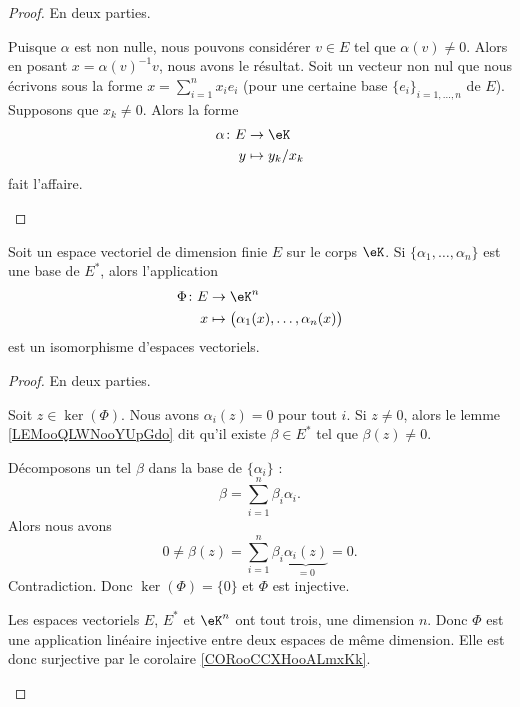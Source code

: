 \begin{proof}
	En deux parties.
	\begin{subproof}
		Puisque \( \alpha\) est non nulle, nous pouvons considérer \( v\in E\) tel que \( \alpha(v)\neq 0\). Alors en posant \( x=\alpha(v)^{-1}  v\), nous avons le résultat.
		Soit un vecteur non nul que nous écrivons sous la forme \( x=\sum_{i=1}^nx_ie_i\) (pour une certaine base \( \{ e_i \}_{i=1,\ldots, n}\) de \( E\)). Supposons que \( x_k\neq 0\). Alors la forme
		\begin{equation}
			\begin{aligned}
				\alpha\colon  E & \to \eK         \\
				y               & \mapsto y_k/x_k
			\end{aligned}
		\end{equation}
		fait l'affaire.
	\end{subproof}
\end{proof}

\begin{lemma}       \label{LEMooKTREooBrnWVz}
	Soit un espace vectoriel de dimension finie \( E\) sur le corps \( \eK\). Si \( \{ \alpha_1,\ldots,\alpha_n \}\) est une base de \( E^*\), alors l'application
	\begin{equation}
		\begin{aligned}
			\Phi\colon E & \to \eK^n                                           \\
			x            & \mapsto \big( \alpha_1(x),\ldots, \alpha_n(x) \big)
		\end{aligned}
	\end{equation}
	est un isomorphisme d'espaces vectoriels.
\end{lemma}

\begin{proof}
	En deux parties.
	\begin{subproof}
		Soit \( z\in \ker(\Phi)\). Nous avons \( \alpha_i(z)=0\) pour tout \( i\). Si \( z\neq 0\), alors le lemme \ref{LEMooQLWNooYUpGdo} dit qu'il existe \( \beta\in E^*\) tel que \( \beta(z)\neq 0\).

		Décomposons un tel \( \beta\) dans la base de \( \{\alpha_i\}\) :
		\begin{equation}
			\beta=\sum_{i=1}^n\beta_i\alpha_i.
		\end{equation}
		Alors nous avons
		\begin{equation}
			0\neq \beta(z)=\sum_{i=1}^n\beta_i\underbrace{\alpha_i(z)}_{=0}=0.
		\end{equation}
		Contradiction. Donc \( \ker(\Phi)=\{ 0 \}\) et \( \Phi\) est injective.

		Les espaces vectoriels \( E\), \( E^*\) et \( \eK^n\) ont tout trois, une dimension \( n\). Donc \( \Phi\) est une application linéaire injective entre deux espaces de même dimension. Elle est donc surjective par le corolaire \ref{CORooCCXHooALmxKk}.
	\end{subproof}
\end{proof}


